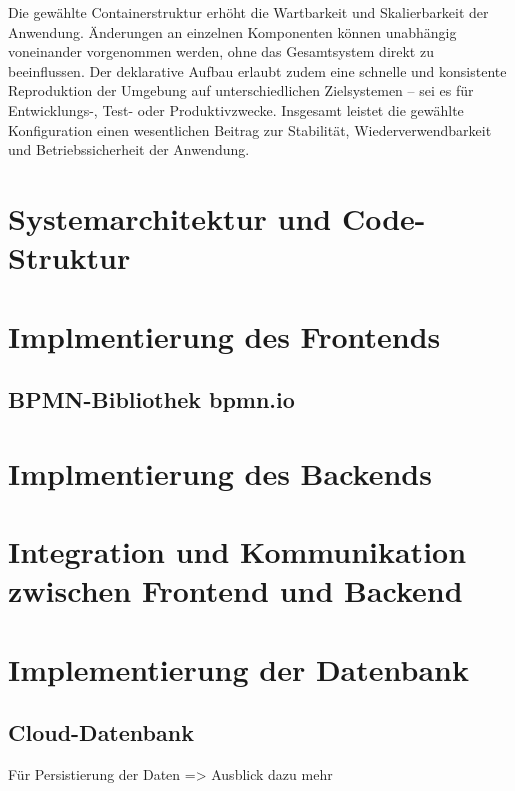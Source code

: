 Die gewählte Containerstruktur erhöht die Wartbarkeit und Skalierbarkeit der Anwendung. Änderungen an einzelnen Komponenten können unabhängig voneinander vorgenommen werden, ohne das Gesamtsystem direkt zu beeinflussen. Der deklarative Aufbau erlaubt zudem eine schnelle und konsistente Reproduktion der Umgebung auf unterschiedlichen Zielsystemen – sei es für Entwicklungs-, Test- oder Produktivzwecke. Insgesamt leistet die gewählte Konfiguration einen wesentlichen Beitrag zur Stabilität, Wiederverwendbarkeit und Betriebssicherheit der Anwendung.























\iffalse

\section{Systemarchitektur und Code-Struktur}


\section{Implmentierung des Frontends}
\subsection{BPMN-Bibliothek bpmn.io}


\section{Implmentierung des Backends}


\section{Integration und Kommunikation zwischen Frontend und Backend}

\section{Implementierung der Datenbank}
\subsection{Cloud-Datenbank}
Für Persistierung der Daten => Ausblick dazu mehr




